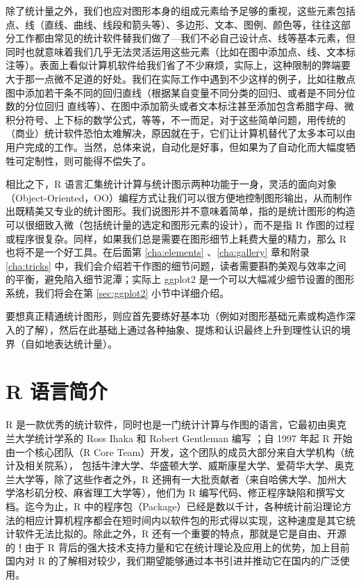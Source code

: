 \documentclass[
  b5paper,
  UTF8,twoside]{book}
\begin{document}
除了统计量之外，我们也应对图形本身的组成元素给予足够的重视，这些元素包括点、线（直线、曲线、线段和箭头等）、多边形、文本、图例、颜色等，往往这部分工作都由常见的统计软件替我们做了---我们不必自己设计点、线等基本元素，但同时也就意味着我们几乎无法灵活运用这些元素（比如在图中添加点、线、文本标注等）。表面上看似计算机软件给我们省了不少麻烦，实际上，这种限制的弊端要大于那一点微不足道的好处。我们在实际工作中遇到不少这样的例子，比如往散点图中添加若干条不同的回归直线（根据某自变量不同分类的回归、或者是不同分位数的分位回归 \citep{quantreg} 直线等）、在图中添加箭头或者文本标注甚至添加包含希腊字母、微积分符号、上下标的数学公式，等等，不一而足，对于这些简单问题，用传统的（商业）统计软件恐怕太难解决，原因就在于，它们让计算机替代了太多本可以由用户完成的工作。当然，总体来说，自动化是好事，但如果为了自动化而大幅度牺牲可定制性，则可能得不偿失了。

相比之下，R 语言汇集统计计算与统计图示两种功能于一身，灵活的面向对象（Object-Oriented，OO）编程方式让我们可以很方便地控制图形输出，从而制作出既精美又专业的统计图形。我们说图形并不意味着简单，指的是统计图形的构造可以很细致入微（包括统计量的选定和图形元素的设计），而不是指 R 作图的过程或程序很复杂。同样，如果我们总是需要在图形细节上耗费大量的精力，那么 R 也将不是一个好工具。在后面第 \ref{cha:elements} 、\ref{cha:gallery} 章和附录 \ref{cha:tricks} 中，我们会介绍若干作图的细节问题，读者需要斟酌美观与效率之间的平衡，避免陷入细节泥潭；实际上 ggplot2 是一个可以大幅减少细节设置的图形系统，我们将会在第 \ref{sec:ggplot2} 小节中详细介绍。

要想真正精通统计图形，则应首先要练好基本功（例如对图形基础元素或构造作深入的了解），然后在此基础上通过各种抽象、提炼和认识最终上升到理性认识的境界（自如地表达统计量）。

\section{R 语言简介}\label{sec:R-intro}

R\citep{base} 是一款优秀的统计软件，同时也是一门统计计算与作图的语言，它最初由奥克兰大学统计学系的 Ross Ihaka 和 Robert Gentleman 编写 \citep{Ihaka96}；自 1997 年起 R 开始由一个核心团队（R Core Team）开发，这个团队的成员大部分来自大学机构（统计及相关院系），
包括牛津大学、华盛顿大学、威斯康星大学、爱荷华大学、奥克兰大学等，除了这些作者之外，R 还拥有一大批贡献者（来自哈佛大学、加州大学洛杉矶分校、麻省理工大学等），他们为 R 编写代码、修正程序缺陷和撰写文档。迄今为止，R 中的程序包（Package）已经是数以千计，各种统计前沿理论方法的相应计算机程序都会在短时间内以软件包的形式得以实现，这种速度是其它统计软件无法比拟的。除此之外，R 还有一个重要的特点，那就是它是自由、开源的！由于 R 背后的强大技术支持力量和它在统计理论及应用上的优势，加上目前国内对 R 的了解相对较少，我们期望能够通过本书引进并推动它在国内的广泛使用。
\end{document}
